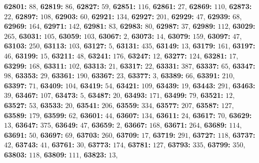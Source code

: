 \textsf{\bfseries 62801:} $88$, \textsf{\bfseries 62819:} $86$, \textsf{\bfseries 62827:} $59$, \textsf{\bfseries 62851:} $116$, \textsf{\bfseries 62861:} $27$, \textsf{\bfseries 62869:} $110$, \textsf{\bfseries 62873:} $22$, \textsf{\bfseries 62897:} $108$, \textsf{\bfseries 62903:} $60$, \textsf{\bfseries 62921:} $134$, \textsf{\bfseries 62927:} $201$, \textsf{\bfseries 62929:} $47$, \textsf{\bfseries 62939:} $68$, \textsf{\bfseries 62969:} $164$, \textsf{\bfseries 62971:} $142$, \textsf{\bfseries 62981:} $83$, \textsf{\bfseries 62983:} $80$, \textsf{\bfseries 62987:} $37$, \textsf{\bfseries 62989:} $112$, \textsf{\bfseries 63029:} $265$, \textsf{\bfseries 63031:} $105$, \textsf{\bfseries 63059:} $103$, \textsf{\bfseries 63067:} $2$, \textsf{\bfseries 63073:} $14$, \textsf{\bfseries 63079:} $159$, \textsf{\bfseries 63097:} $47$, \textsf{\bfseries 63103:} $250$, \textsf{\bfseries 63113:} $103$, \textsf{\bfseries 63127:} $5$, \textsf{\bfseries 63131:} $435$, \textsf{\bfseries 63149:} $13$, \textsf{\bfseries 63179:} $161$, \textsf{\bfseries 63197:} $46$, \textsf{\bfseries 63199:} $15$, \textsf{\bfseries 63211:} $48$, \textsf{\bfseries 63241:} $176$, \textsf{\bfseries 63247:} $12$, \textsf{\bfseries 63277:} $124$, \textsf{\bfseries 63281:} $17$, \textsf{\bfseries 63299:} $168$, \textsf{\bfseries 63311:} $102$, \textsf{\bfseries 63313:} $21$, \textsf{\bfseries 63317:} $22$, \textsf{\bfseries 63331:} $387$, \textsf{\bfseries 63337:} $65$, \textsf{\bfseries 63347:} $98$, \textsf{\bfseries 63353:} $29$, \textsf{\bfseries 63361:} $190$, \textsf{\bfseries 63367:} $23$, \textsf{\bfseries 63377:} $3$, \textsf{\bfseries 63389:} $66$, \textsf{\bfseries 63391:} $210$, \textsf{\bfseries 63397:} $71$, \textsf{\bfseries 63409:} $104$, \textsf{\bfseries 63419:} $54$, \textsf{\bfseries 63421:} $109$, \textsf{\bfseries 63439:} $19$, \textsf{\bfseries 63443:} $291$, \textsf{\bfseries 63463:} $39$, \textsf{\bfseries 63467:} $107$, \textsf{\bfseries 63473:} $5$, \textsf{\bfseries 63487:} $20$, \textsf{\bfseries 63493:} $171$, \textsf{\bfseries 63499:} $79$, \textsf{\bfseries 63521:} $12$, \textsf{\bfseries 63527:} $53$, \textsf{\bfseries 63533:} $20$, \textsf{\bfseries 63541:} $206$, \textsf{\bfseries 63559:} $334$, \textsf{\bfseries 63577:} $207$, \textsf{\bfseries 63587:} $127$, \textsf{\bfseries 63589:} $179$, \textsf{\bfseries 63599:} $62$, \textsf{\bfseries 63601:} $44$, \textsf{\bfseries 63607:} $134$, \textsf{\bfseries 63611:} $24$, \textsf{\bfseries 63617:} $70$, \textsf{\bfseries 63629:} $13$, \textsf{\bfseries 63647:} $375$, \textsf{\bfseries 63649:} $47$, \textsf{\bfseries 63659:} $2$, \textsf{\bfseries 63667:} $168$, \textsf{\bfseries 63671:} $264$, \textsf{\bfseries 63689:} $114$, \textsf{\bfseries 63691:} $50$, \textsf{\bfseries 63697:} $69$, \textsf{\bfseries 63703:} $260$, \textsf{\bfseries 63709:} $17$, \textsf{\bfseries 63719:} $291$, \textsf{\bfseries 63727:} $118$, \textsf{\bfseries 63737:} $42$, \textsf{\bfseries 63743:} $41$, \textsf{\bfseries 63761:} $30$, \textsf{\bfseries 63773:} $174$, \textsf{\bfseries 63781:} $127$, \textsf{\bfseries 63793:} $335$, \textsf{\bfseries 63799:} $350$, \textsf{\bfseries 63803:} $118$, \textsf{\bfseries 63809:} $111$, \textsf{\bfseries 63823:} $13$, 
